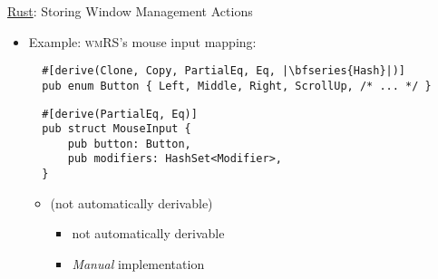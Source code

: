 \begin{frame}[fragile]{\underline{Rust}: Storing Window Management Actions \hfill {\footnotesize \currentname}}


    \begin{itemize}

        \item Example: \textsc{wmRS}'s mouse input mapping:\\[3pt]
\begin{verbatim}
  #[derive(Clone, Copy, PartialEq, Eq, |\bfseries{Hash}|)]
  pub enum Button { Left, Middle, Right, ScrollUp, /* ... */ }
\end{verbatim}
\begin{verbatim}
  #[derive(PartialEq, Eq)]
  pub struct MouseInput {
      pub button: Button,
      pub modifiers: HashSet<Modifier>,
  }
\end{verbatim}

    \vspace*{5pt}\begin{itemize}

        \item {} (not automatically derivable)
            \begin{itemize}
                \item {} not automatically derivable
                \item \textit{Manual} implementation
            \end{itemize}

    \end{itemize}

    \end{itemize}

    \vfill

\end{frame}

